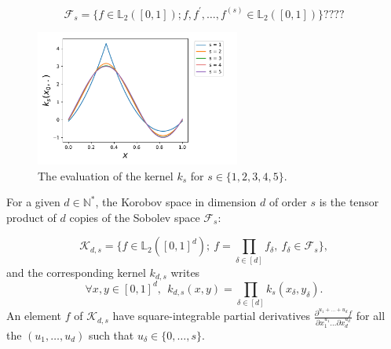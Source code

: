 \documentclass[twoside,11pt]{book}
\begin{document}
\begin{equation}
\mathcal{F}_{s} = \{f \in \mathbb{L}_{2}([0,1]); f,f^{'}, \dots, f^{(s)} \in \mathbb{L}_{2}([0,1]) \}????
\end{equation}
\begin{figure}[]
    \centering
\includegraphics[width= 0.6\textwidth]{img/Sobolev/Bernoulli_kernels_same_node_s_1_5.pdf}
\caption{The evaluation of the kernel $k_{s}$ for $s \in \{1,2,3,4,5\}$.
\label{fig:periodic_sobolev_kernel}}
\end{figure}
For a given $d \in \mathbb{N}^{*}$, the Korobov space in dimension $d$ of order $s$  is the tensor product of $d$ copies of the Sobolev space $\mathcal{F}_{s}$:

\begin{equation}
\mathcal{K}_{d,s} = \{ f \in \mathbb{L}_{2}([0,1]^{d}); \: f = \prod\limits_{\delta \in [d]} f_{\delta}, \: f_{\delta} \in \mathcal{F}_{s} \},
\end{equation}
and the corresponding kernel $k_{d,s}$ writes
\begin{equation}
\forall x,y \in [0,1]^{d}, \:\: k_{d,s}(x,y) = \prod\limits_{\delta \in [d]}k_{s}(x_{\delta},y_{\delta}).
\end{equation}
An element $f$ of $\mathcal{K}_{d,s}$ have square-integrable partial derivatives $\displaystyle \frac{\partial^{u_{1}+ \dots + u_{d}}f}{\partial x_{1}^{u_{1}} \dots \partial x_{d}^{u_{d}}} $ for all the $(u_{1}, \dots,u_{d})$ such that $u_{\delta} \in \{0, \dots, s\}$.
\end{document}

